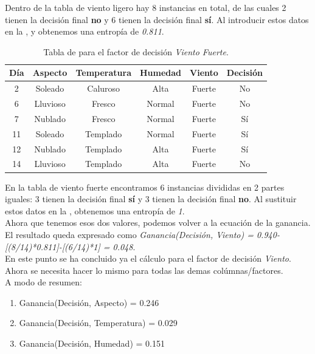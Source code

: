 \begin{UClist}
	Dentro de la tabla de viento ligero hay 8 instancias en total, de las cuales 2 tienen la decisión final \textbf{no} y 6 tienen la decisión final \textbf{sí}. Al introducir estos datos en la , y obtenemos una entropía de \emph{0.811}.\\

	\newpage
	\begin{table}[!hb]
		\begin{center}
			\label{tab:tablaInduccionVientoFuerte}
			\begin{tabular}{c|c|c|c|c|c}
				\textbf{Día} & \textbf{Aspecto} & \textbf{Temperatura} & \textbf{Humedad} & \textbf{Viento} & \textbf{Decisión}\\
				\hline
				2 & Soleado & Caluroso & Alta & Fuerte & No\\
				6 & Lluvioso & Fresco & Normal & Fuerte & No\\
				7 & Nublado & Fresco & Normal & Fuerte & Sí\\
				11 & Soleado & Templado & Normal & Fuerte & Sí\\
				12 & Nublado & Templado & Alta & Fuerte & Sí\\
				14 & Lluvioso & Templado & Alta & Fuerte & No\\
			\end{tabular}
		\end{center}
		\caption{Tabla de para el factor de decisión \emph{Viento Fuerte}.}
	\end{table}

	En la tabla de viento fuerte encontramos 6 instancias divididas en 2 partes iguales: 3 tienen la decisión final \textbf{sí} y 3 tienen la decisión final \textbf{no}. Al sustituir estos datos en la , obtenemos una entropía de \emph{1}.\\

	\UCli Ahora que tenemos esos dos valores, podemos volver a la ecuación de la ganancia. El resultado queda expresado como \emph{Ganancia(Decisión, Viento) = 0.940-[(8/14)*0.811]-[(6/14)*1] = 0.048}.\\

	\UCli En este punto se ha concluido ya el cálculo para el factor de decisión \emph{Viento}. Ahora se necesita hacer lo mismo para todas las demas colúmnas/factores.\\

	\UCli A modo de resumen:

	\begin{enumerate}
		\item Ganancia(Decisión, Aspecto) = 0.246
		\item Ganancia(Decisión, Temperatura) = 0.029
		\item Ganancia(Decisión, Humedad) = 0.151
	\end{enumerate}


\end{UClist}
